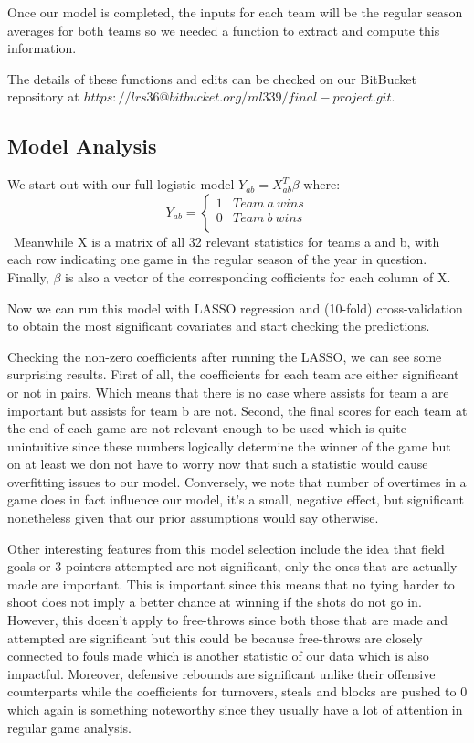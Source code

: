 \documentclass{article} %
\begin{document}
Once our model is completed, the inputs for each team will be the regular season averages for both teams so we needed a function to extract and compute this information.

The details of these functions and edits can be checked on our BitBucket repository at $https://lrs36@bitbucket.org/ml339/final-project.git$.

\subsection{Model Analysis}

We start out with our full logistic model $Y_{ab} = X_{ab}^T \beta$ where:\
\[ Y_{ab} = \left\{
\begin{array}{ll}
1 & Team \ a \ wins \\
0 &  Team \ b \ wins \\
\end{array} 
\right. \]\
Meanwhile X is a matrix of all 32 relevant statistics for teams a and b, with each row indicating one game in the regular season of the year in question. Finally, $\beta$ is also a vector of the corresponding cofficients for each column of X.\

Now we can run this model with LASSO regression and (10-fold) cross-validation to obtain the most significant covariates and start checking the predictions.\

Checking the non-zero coefficients after running the LASSO, we can see some surprising results. 
First of all, the coefficients for each team are either significant or not in pairs. Which means that there is no case where assists for team a are important but assists for team b are not. Second, the final scores for each team at the end of each game are not relevant enough to be used which is quite unintuitive since these numbers logically determine the winner of the game but on at least we don not have to worry now that such a statistic would cause overfitting issues to our model. Conversely, we note that number of overtimes in a game does in fact influence our model, it's a small, negative effect, but significant nonetheless given that our prior assumptions would say otherwise. \

Other interesting features from this model selection include the idea that field goals or 3-pointers attempted are not significant, only the ones that are actually made are important. This is important since this means that no tying harder to shoot does not imply a better chance at winning if the shots do not go in. However, this doesn't apply to free-throws since both those that are made and attempted are significant but this could be because free-throws are closely connected to fouls made which is another statistic of our data which is also impactful. Moreover, defensive rebounds are significant unlike their offensive counterparts while the coefficients for turnovers, steals and blocks are pushed to 0 which again is something noteworthy since they usually have a lot of attention in regular game analysis.\
\end{document}
